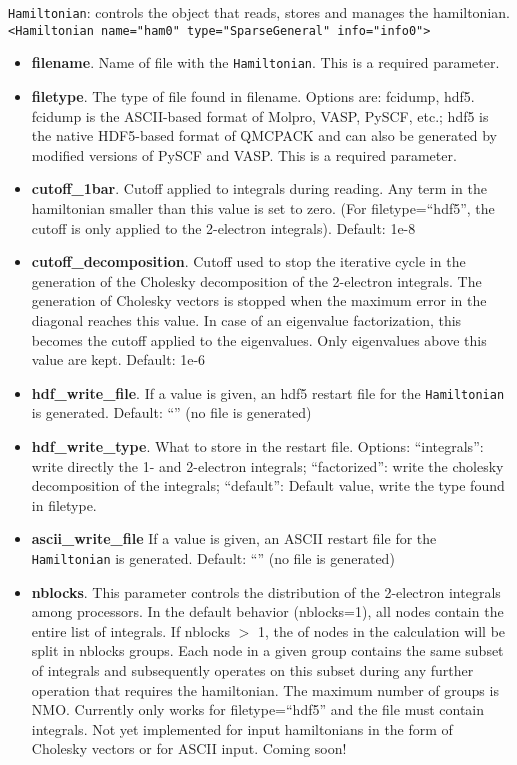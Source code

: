 \texttt{Hamiltonian}: controls the object that reads, stores and manages the hamiltonian. 
  \texttt{<Hamiltonian name="ham0" type="SparseGeneral" info="info0">}
\begin{itemize}
\item \textbf{filename}. Name of file with the \texttt{Hamiltonian}. This is a required parameter.
\item \textbf{filetype}. The type of file found in filename. Options are: fcidump, hdf5. fcidump is the ASCII-based format of Molpro, VASP, PySCF, etc.; hdf5 is the native HDF5-based format  of QMCPACK and can also be generated by modified versions of PySCF and VASP. This is a required parameter.
\item \textbf{cutoff\_1bar}. Cutoff applied to integrals during reading. Any term in the hamiltonian smaller than this value is set to zero. (For filetype=``hdf5'', the cutoff is only applied to the 2-electron integrals). Default: 1e-8
\item \textbf{cutoff\_decomposition}. Cutoff used to stop the iterative cycle in the generation of the Cholesky decomposition of the 2-electron integrals. The generation of Cholesky vectors is stopped when the maximum error in the diagonal reaches this value. In case of an eigenvalue factorization, this becomes the cutoff applied to the eigenvalues. Only eigenvalues above this value are kept. Default: 1e-6
\item \textbf{hdf\_write\_file}. If a value is given, an hdf5 restart file for the \texttt{Hamiltonian} is generated. Default: ``'' (no file is generated)
\item \textbf{hdf\_write\_type}. What to store in the restart file. Options: ``integrals'': write directly the 1- and 2-electron integrals; ``factorized'': write the cholesky decomposition of the integrals; ``default'': Default value, write the type found in filetype.
\item \textbf{ascii\_write\_file} If a value is given, an ASCII restart file for the \texttt{Hamiltonian} is generated. Default: ``'' (no file is generated)
\item \textbf{nblocks}. This parameter controls the distribution of the 2-electron integrals among processors. In the default behavior (nblocks=1), all nodes contain the entire list of integrals. If nblocks $>$ 1, the of nodes in the calculation will be split in nblocks groups. Each node in a given group contains the same subset of integrals and subsequently operates on this subset during  any further operation that requires the hamiltonian. The maximum number of groups is NMO. Currently only works for filetype=``hdf5'' and the file must contain integrals.  Not yet implemented for input hamiltonians in the form of Cholesky vectors or for ASCII input. Coming soon!

\end{itemize}
